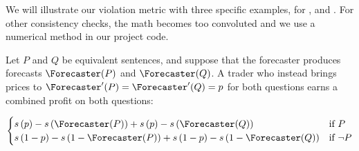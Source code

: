 



We will illustrate our violation metric with three specific examples, for \ParaphraseChecker{}, \NegChecker{} and \CondChecker{}. For other consistency checks, the math becomes too convoluted and we use a numerical method in our project code.

\label{apps:checks-paraphrase}


Let $P$ and $Q$ be equivalent sentences, and suppose that the forecaster produces forecasts $\priceP$ and $\priceQ$. A trader who instead brings prices to $\Forecaster'(P)=\Forecaster'(Q)=\consp$ for both questions earns a combined profit on both questions:

\begin{equation}
\begin{cases}
    \score{\consp}-\score{\priceP}+\score{\consp}-\score{\priceQ} & \text{if } P \\
    \score{1-\consp}-\score{1-\priceP}+\score{1-\consp}-\score{1-\priceQ} & \text{if } \lnot P
\end{cases}
\label{eq:profit-paraphrase}
\end{equation}

